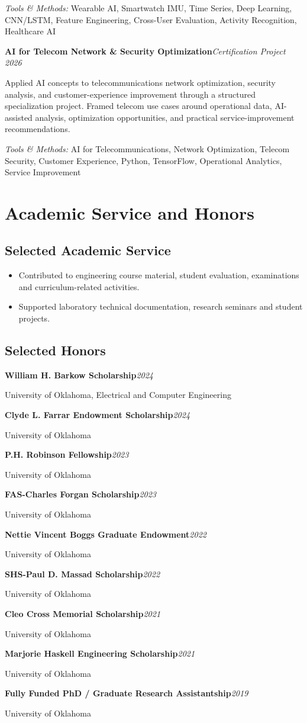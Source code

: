 \documentclass[9pt,letterpaper]{extarticle}
\newcommand{\entry}[2]{\Needspace{4\baselineskip}\textbf{#1}\hfill\textit{#2}\par}
\begin{document}
{\small\textit{Tools \& Methods:} Wearable AI, Smartwatch IMU, Time Series, Deep Learning, CNN/LSTM, Feature Engineering, Cross-User Evaluation, Activity Recognition, Healthcare AI\par}
\vspace{1pt}
\entry{AI for Telecom Network \& Security Optimization}{Certification Project \textbar{} 2026}
Applied AI concepts to telecommunications network optimization, security analysis, and customer-experience improvement through a structured specialization project. Framed telecom use cases around operational data, AI-assisted analysis, optimization opportunities, and practical service-improvement recommendations.\par
{\small\textit{Tools \& Methods:} AI for Telecommunications, Network Optimization, Telecom Security, Customer Experience, Python, TensorFlow, Operational Analytics, Service Improvement\par}
\vspace{1pt}
\section{Academic Service and Honors}
\subsection{Selected Academic Service}
\begin{itemize}
\item Contributed to engineering course material, student evaluation, examinations and curriculum-related activities.
\item Supported laboratory technical documentation, research seminars and student projects.
\end{itemize}
\subsection{Selected Honors}
\entry{William H. Barkow Scholarship}{2024}
{\small University of Oklahoma, Electrical and Computer Engineering\par}
\entry{Clyde L. Farrar Endowment Scholarship}{2024}
{\small University of Oklahoma\par}
\entry{P.H. Robinson Fellowship}{2023}
{\small University of Oklahoma\par}
\entry{FAS-Charles Forgan Scholarship}{2023}
{\small University of Oklahoma\par}
\entry{Nettie Vincent Boggs Graduate Endowment}{2022}
{\small University of Oklahoma\par}
\entry{SHS-Paul D. Massad Scholarship}{2022}
{\small University of Oklahoma\par}
\entry{Cleo Cross Memorial Scholarship}{2021}
{\small University of Oklahoma\par}
\entry{Marjorie Haskell Engineering Scholarship}{2021}
{\small University of Oklahoma\par}
\entry{Fully Funded PhD / Graduate Research Assistantship}{2019}
{\small University of Oklahoma\par}
\end{document}
